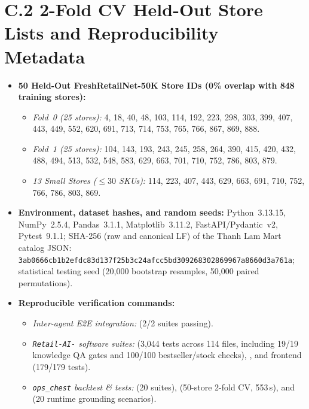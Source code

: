 \section*{C.2 2-Fold CV Held-Out Store Lists and Reproducibility Metadata}
\begin{itemize}
    \item \textbf{50 Held-Out FreshRetailNet-50K Store IDs (0\% overlap with 848 training stores):}
    \begin{itemize}
        \item \emph{Fold~0 (25 stores):} 4, 18, 40, 48, 103, 114, 192, 223, 298, 303, 399, 407, 443, 449, 552, 620, 691, 713, 714, 753, 765, 766, 867, 869, 888.
        \item \emph{Fold~1 (25 stores):} 104, 143, 193, 243, 245, 258, 264, 390, 415, 420, 432, 488, 494, 513, 532, 548, 583, 629, 663, 701, 710, 752, 786, 803, 879.
        \item \emph{13 Small Stores ($\le 30$ SKUs):} 114, 223, 407, 443, 629, 663, 691, 710, 752, 766, 786, 803, 869.
    \end{itemize}
    \item \textbf{Environment, dataset hashes, and random seeds:} Python~3.13.15, NumPy~2.5.4, Pandas~3.1.1, Matplotlib~3.11.2, FastAPI/Pydantic~v2, Pytest~9.1.1; SHA-256 (raw and canonical LF) of the Thanh Lam Mart catalog JSON: \texttt{\small 3ab0666cb1b2efdc\allowbreak 83d137f25b3c24af\allowbreak cc5bd30926830286\allowbreak 9967a8660d3a761a}; statistical testing seed  (20,000 bootstrap resamples, 50,000 paired permutations).
    \item \textbf{Reproducible verification commands:}
    \begin{itemize}
        \item \emph{Inter-agent E2E integration:}  (2/2 suites passing).
        \item \emph{\texttt{Retail-AI-} software suites:}  (3,044 tests across 114 files, including 19/19 knowledge QA gates and 100/100 bestseller/stock checks), , and frontend  (179/179 tests).
        \item \emph{\texttt{ops\_chest} backtest \& tests:}  (20 suites),  (50-store 2-fold CV, 553\,s), and  (20 runtime grounding scenarios).
    \end{itemize}
\end{itemize}
